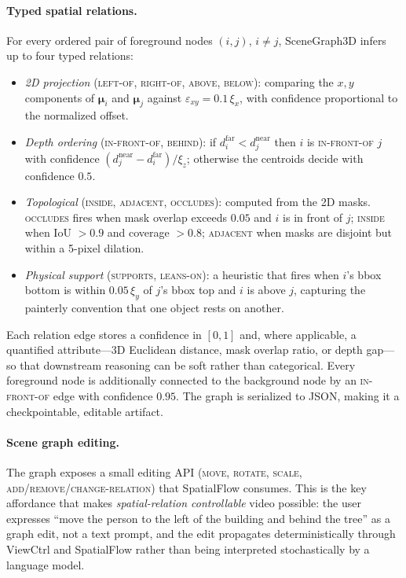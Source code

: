 \paragraph{Typed spatial relations.}
For every ordered pair of foreground nodes $(i, j)$, $i \neq j$,
SceneGraph3D infers up to four typed relations:
\begin{itemize}
    \item \emph{2D projection} (\textsc{left-of},
    \textsc{right-of}, \textsc{above}, \textsc{below}): comparing the
    $x,y$ components of $\boldsymbol{\mu}_i$ and $\boldsymbol{\mu}_j$
    against $\varepsilon_{xy} = 0.1\,\xi_x$, with confidence
    proportional to the normalized offset.
    \item \emph{Depth ordering} (\textsc{in-front-of},
    \textsc{behind}): if $d_i^\text{far} < d_j^\text{near}$ then $i$
    is \textsc{in-front-of} $j$ with confidence
    $(d_j^\text{near} - d_i^\text{far})/\xi_z$; otherwise the
    centroids decide with confidence $0.5$.
    \item \emph{Topological} (\textsc{inside}, \textsc{adjacent},
    \textsc{occludes}): computed from the 2D masks. \textsc{occludes}
    fires when mask overlap exceeds $0.05$ and $i$ is in front of $j$;
    \textsc{inside} when IoU $> 0.9$ and coverage $> 0.8$;
    \textsc{adjacent} when masks are disjoint but within a 5-pixel
    dilation.
    \item \emph{Physical support} (\textsc{supports},
    \textsc{leans-on}): a heuristic that fires when $i$'s bbox bottom
    is within $0.05\,\xi_y$ of $j$'s bbox top and $i$ is above $j$,
    capturing the painterly convention that one object rests on
    another.
\end{itemize}
Each relation edge stores a confidence in $[0,1]$ and, where
applicable, a quantified attribute---3D Euclidean distance, mask
overlap ratio, or depth gap---so that downstream reasoning can be
soft rather than categorical. Every foreground node is additionally
connected to the background node by an \textsc{in-front-of} edge with
confidence $0.95$. The graph is serialized to JSON, making it a
checkpointable, editable artifact.

\paragraph{Scene graph editing.}
The graph exposes a small editing API
(\textsc{move}, \textsc{rotate}, \textsc{scale},
\textsc{add/remove/change-relation}) that SpatialFlow consumes. This is the
key affordance that makes \emph{spatial-relation controllable} video
possible: the user expresses ``move the person to the left of the
building and behind the tree'' as a graph edit, not a text prompt, and
the edit propagates deterministically through ViewCtrl and SpatialFlow
rather than being interpreted stochastically by a language model.

